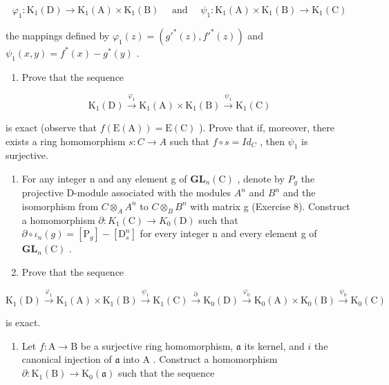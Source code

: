 \[
\varphi_ {1}: \mathrm{K} _ {1} (\mathrm{D}) \rightarrow \mathrm{K} _ {1} (\mathrm{A}) \times \mathrm{K} _ {1} (\mathrm{B}) \quad \text { and } \quad \psi_ {1}: \mathrm{K} _ {1} (\mathrm{A}) \times \mathrm{K} _ {1} (\mathrm{B}) \rightarrow \mathrm{K} _ {1} (\mathrm{C})
\]

the mappings defined by \(\varphi_1(z) = (g'^* (z), f'^* (z))\) and \(\psi_1(x,y) = f^* (x) - g^* (y)\) .

\begin{enumerate}
\def\labelenumi{\alph{enumi})}
\tightlist
\item
  Prove that the sequence
\end{enumerate}

\[
\mathrm{K} _ {1} (\mathrm{D}) \xrightarrow {\varphi_ {1}} \mathrm{K} _ {1} (\mathrm{A}) \times \mathrm{K} _ {1} (\mathrm{B}) \xrightarrow {\psi_ {1}} \mathrm{K} _ {1} (\mathrm{C})
\]

is exact (observe that \(f(\mathrm{E}(\mathrm{A})) = \mathrm{E}(\mathrm{C})\) ). Prove that if, moreover, there exists a ring homomorphism \(s : C \to A\) such that \(f \circ s = Id_{C}\) , then \(\psi_{1}\) is surjective.

\begin{enumerate}
\def\labelenumi{\alph{enumi})}
\setcounter{enumi}{1}
\item
  For any integer n and any element g of \(\mathbf{GL}_{n}(\mathrm{C})\) , denote by \(P_{g}\) the projective D-module associated with the modules \(A^{n}\) and \(B^{n}\) and the isomorphism from \(C \otimes_{A} A^{n}\) to \(C \otimes_{B} B^{n}\) with matrix g (Exercise 8). Construct a homomorphism \(\partial : K_{1}(\mathrm{C}) \to K_{0}(\mathrm{D})\) such that \(\partial \circ \iota_{n}(g) = [\mathrm{P}_{g}] - [\mathrm{D}_{s}^{n}]\) for every integer n and every element g of \(\mathbf{GL}_{n}(\mathrm{C})\) .
\item
  Prove that the sequence
\end{enumerate}

\[
\mathrm{K} _ {1} (\mathrm{D}) \xrightarrow {\varphi_ {1}} \mathrm{K} _ {1} (\mathrm{A}) \times \mathrm{K} _ {1} (\mathrm{B}) \xrightarrow {\psi_ {1}} \mathrm{K} _ {1} (\mathrm{C}) \xrightarrow {\partial} \mathrm{K} _ {0} (\mathrm{D}) \xrightarrow {\varphi_ {0}} \mathrm{K} _ {0} (\mathrm{A}) \times \mathrm{K} _ {0} (\mathrm{B}) \xrightarrow {\psi_ {0}} \mathrm{K} _ {0} (\mathrm{C})
\]

is exact.

\begin{enumerate}
\def\labelenumi{\arabic{enumi})}
\setcounter{enumi}{11}
\tightlist
\item
  Let \(f: \mathrm{A} \to \mathrm{B}\) be a surjective ring homomorphism, \(\mathfrak{a}\) its kernel, and \(i\) the canonical injection of \(\mathfrak{a}\) into \(\mathrm{A}\) . Construct a homomorphism \(\partial: \mathrm{K}_1(\mathrm{B}) \to \mathrm{K}_0(\mathfrak{a})\) such that the sequence
\end{enumerate}

